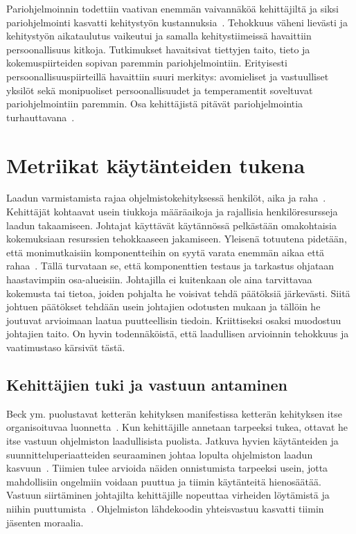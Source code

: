 \documentclass[finnish]{../tktltiki2}
\theoremstyle{definition}
\theoremstyle{remark}
\begin{document}
    Pariohjelmoinnin todettiin vaativan enemmän vaivannäköä kehittäjiltä ja siksi pariohjelmointi kasvatti kehitystyön 
kustannuksia~\cite{SS10}. Tehokkuus väheni lievästi ja kehitystyön aikataulutus vaikeutui ja samalla kehitystiimeissä 
havaittiin persoonallisuus kitkoja. Tutkimukset havaitsivat tiettyjen taito, tieto ja kokemuspiirteiden sopivan paremmin 
pariohjelmointiin. Erityisesti persoonallisuuspiirteillä havaittiin suuri merkitys: avomieliset ja vastuulliset yksilöt 
sekä monipuoliset persoonallisuudet ja temperamentit soveltuvat pariohjelmointiin paremmin. Osa kehittäjistä pitävät 
pariohjelmointia turhauttavana~\cite{DD08}.

\section{Metriikat käytänteiden tukena}

Laadun varmistamista rajaa ohjelmistokehityksessä henkilöt, aika ja raha~\cite{BBM96, ZN08}. Kehittäjät kohtaavat usein 
tiukkoja määräaikoja ja rajallisia henkilöresursseja laadun takaamiseen. Johtajat käyttävät käytännössä pelkästään 
omakohtaisia kokemuksiaan resurssien tehokkaaseen jakamiseen. Yleisenä totuutena pidetään, että monimutkaisiin 
komponentteihin on syytä varata enemmän aikaa että rahaa~\cite{BBM96, ZN08}. Tällä turvataan se, että komponenttien 
testaus ja tarkastus ohjataan haastavimpiin osa-alueisiin. Johtajilla ei kuitenkaan ole aina tarvittavaa kokemusta tai 
tietoa, joiden pohjalta he voisivat tehdä päätöksiä järkevästi. Siitä johtuen päätökset tehdään usein johtajien 
odotusten mukaan ja tällöin he joutuvat arvioimaan laatua puutteellisin tiedoin. Kriittiseksi osaksi muodostuu johtajien 
taito. On hyvin todennäköistä, että laadullisen arvioinnin tehokkuus ja vaatimustaso kärsivät tästä.

\subsection{Kehittäjien tuki ja vastuun antaminen}

Beck ym. puolustavat ketterän kehityksen manifestissa ketterän kehityksen itse organisoituvaa luonnetta~\cite{BBB01}. 
Kun kehittäjille annetaan tarpeeksi tukea, ottavat he itse vastuun ohjelmiston laadullisista puolista. Jatkuva hyvien 
käytänteiden ja suunnitteluperiaatteiden seuraaminen johtaa lopulta ohjelmiston laadun kasvuun~\cite{SS10}. Tiimien 
tulee arvioida näiden onnistumista tarpeeksi usein, jotta mahdollisiin ongelmiin voidaan puuttua ja tiimin käytänteitä 
hienosäätää. Vastuun siirtäminen johtajilta kehittäjille nopeuttaa virheiden löytämistä ja niihin 
puuttumista~\cite{DD08}. Ohjelmiston lähdekoodin yhteisvastuu kasvatti tiimin jäsenten moraalia.
\end{document}
